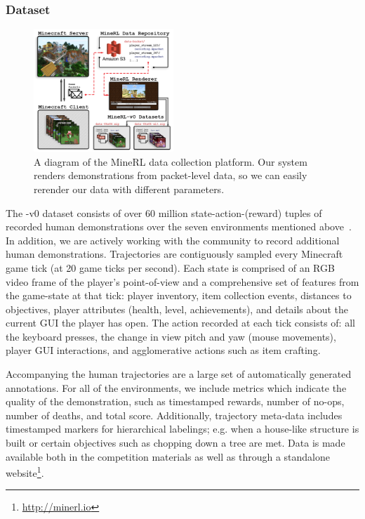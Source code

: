 \subsubsection{Dataset}

 \begin{figure}
    \begin{center}
        \includegraphics[width=0.47\textwidth]{./assets/datapipeline_new.png}
         \caption{\small A diagram of the MineRL data collection platform. Our
        system renders demonstrations from packet-level data, so we can
        easily rerender our data with different parameters.}
        \label{fig:platform_diagram}
    \end{center}
\end{figure}

The \minenet-v0 dataset consists of over 60 million state-action-(reward) tuples of recorded human demonstrations
over the seven environments mentioned above~\cite{gussminerlijcai2019}. In addition, we are actively working with the community to record additional human demonstrations. 
Trajectories are contiguously sampled every Minecraft game tick (at 20 game ticks per second). Each state is comprised of an RGB video frame of the player's point-of-view and a comprehensive set of features from the game-state at that tick:
player inventory, item collection events, distances to objectives, player attributes (health,
level, achievements), and details about the current GUI the player has open. The action
recorded at each tick consists of: all the keyboard presses, the change in view pitch and yaw
(mouse movements), player GUI interactions, and agglomerative
actions such as item crafting.

Accompanying the human trajectories are a large set of automatically generated annotations.
For all of the environments, we include metrics which indicate the quality of the demonstration, such as timestamped rewards, number of no-ops, number of deaths, and total score.
Additionally, trajectory meta-data includes timestamped markers for hierarchical labelings; e.g. when a house-like structure is built or certain objectives such as chopping down a tree are met. Data is made available both in the competition materials as well as through a standalone website\footnote{\url{http://minerl.io}}.

